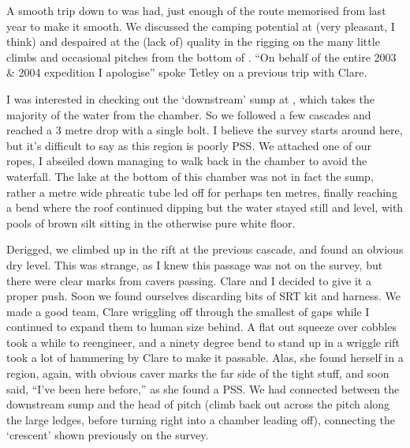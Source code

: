 A smooth trip down to  was had, just enough of the route
memorised from last year to make it smooth. We discussed the camping
potential at  (very pleasant, I think) and despaired at the (lack
of) quality in the rigging on the many little climbs and occasional
pitches from the bottom of . ``On behalf of the entire 2003 \&
2004 expedition I apologise'' spoke Tetley on a previous trip with
Clare.

I was interested in checking out the `downstream' sump at , which
takes the majority of the water from the  chamber. So we
followed a few cascades and reached a 3 metre drop with a single bolt. I
believe the survey starts around here, but it's difficult to say as this
region is poorly PSS. We attached one of our ropes, I abseiled down
managing to walk back in the chamber to avoid the waterfall. The lake at
the bottom of this chamber was not in fact the sump, rather a metre wide
phreatic tube led off for perhaps ten metres, finally reaching a bend
where the roof continued dipping but the water stayed still and level,
with pools of brown silt sitting in the otherwise pure white floor.


Derigged, we climbed up in the rift at the previous cascade, and found
an obvious dry level. This was strange, as I knew this passage was not
on the survey, but there were clear marks from cavers passing. Clare and
I decided to give it a proper push. Soon we found ourselves discarding
bits of SRT kit and harness. We made a good team, Clare wriggling off
through the smallest of gaps while I continued to expand them to human
size behind. A flat out squeeze over cobbles took a while to reengineer,
and a ninety degree bend to stand up in a wriggle rift took a lot of
hammering by Clare to make it passable. Alas, she found herself in a
region, again, with obvious caver marks the far side of the tight stuff,
and soon said, ``I've been here before,'' as she found a  PSS. We had
connected between the downstream  sump and the head of
 pitch (climb back out across the pitch along the large
ledges, before turning right into a chamber leading off), connecting the
`crescent' shown previously on the survey. 

